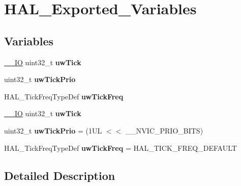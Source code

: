 \hypertarget{group___h_a_l___exported___variables}{}\section{H\+A\+L\+\_\+\+Exported\+\_\+\+Variables}
\label{group___h_a_l___exported___variables}
\subsection*{Variables}
\begin{DoxyCompactItemize}
\item 
\mbox{\label{group___h_a_l___exported___variables_ga9d411ea525781e633bf7ea7ef2f90728}} 
\mbox{\hyperlink{core__sc300_8h_aec43007d9998a0a0e01faede4133d6be}{\+\_\+\+\_\+\+IO}} uint32\+\_\+t {\bfseries uw\+Tick}
\item 
\mbox{\label{group___h_a_l___exported___variables_ga3000c5e83924ed2debb1849c738d4be2}} 
uint32\+\_\+t {\bfseries uw\+Tick\+Prio}
\item 
\mbox{\label{group___h_a_l___exported___variables_ga84a0c55c4d0bff06a085b4fcfd6531cd}} 
H\+A\+L\+\_\+\+Tick\+Freq\+Type\+Def {\bfseries uw\+Tick\+Freq}
\item 
\mbox{\label{group___h_a_l___exported___variables_ga9d411ea525781e633bf7ea7ef2f90728}} 
\mbox{\hyperlink{core__sc300_8h_aec43007d9998a0a0e01faede4133d6be}{\+\_\+\+\_\+\+IO}} uint32\+\_\+t {\bfseries uw\+Tick}
\item 
\mbox{\label{group___h_a_l___exported___variables_ga3000c5e83924ed2debb1849c738d4be2}} 
uint32\+\_\+t {\bfseries uw\+Tick\+Prio} = (1\+U\+L $<$$<$ \+\_\+\+\_\+\+N\+V\+I\+C\+\_\+\+P\+R\+I\+O\+\_\+\+B\+I\+T\+S)
\item 
\mbox{\label{group___h_a_l___exported___variables_ga84a0c55c4d0bff06a085b4fcfd6531cd}} 
H\+A\+L\+\_\+\+Tick\+Freq\+Type\+Def {\bfseries uw\+Tick\+Freq} = H\+A\+L\+\_\+\+T\+I\+C\+K\+\_\+\+F\+R\+E\+Q\+\_\+\+D\+E\+F\+A\+U\+LT
\end{DoxyCompactItemize}


\subsection{Detailed Description}
